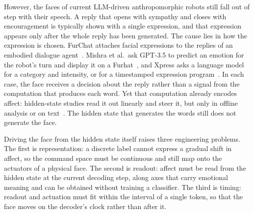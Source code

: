 \documentclass[letterpaper, 10 pt, conference]{ieeeconf/ieeeconf}
\begin{document}
However, the faces of current LLM-driven anthropomorphic robots still fall out of step with their speech. A reply that opens with sympathy and closes with encouragement is typically shown with a single expression, and that expression appears only after the whole reply has been generated. The cause lies in how the expression is chosen. FurChat attaches facial expressions to the replies of an embodied dialogue agent~\cite{cherakara2023furchat}. Mishra et al.\ ask GPT-3.5 to predict an emotion for the robot's turn and display it on a Furhat~\cite{mishra2023realtime}, and Xpress asks a language model for a category and intensity, or for a timestamped expression program~\cite{antony2025xpress}. In each case, the face receives a decision about the reply rather than a signal from the computation that produces each word. Yet that computation already encodes affect: hidden-state studies read it out linearly and steer it, but only in offline analysis or on text~\cite{tigges2024sentiment,reichman2026emotions}. The hidden state that generates the words still does not generate the face.

Driving the face from the hidden state itself raises three engineering problems. The first is representation: a discrete label cannot express a gradual shift in affect, so the command space must be continuous and still map onto the actuators of a physical face. The second is readout: affect must be read from the hidden state at the current decoding step, along axes that carry emotional meaning and can be obtained without training a classifier. The third is timing: readout and actuation must fit within the interval of a single token, so that the face moves on the decoder's clock rather than after it.
\end{document}
